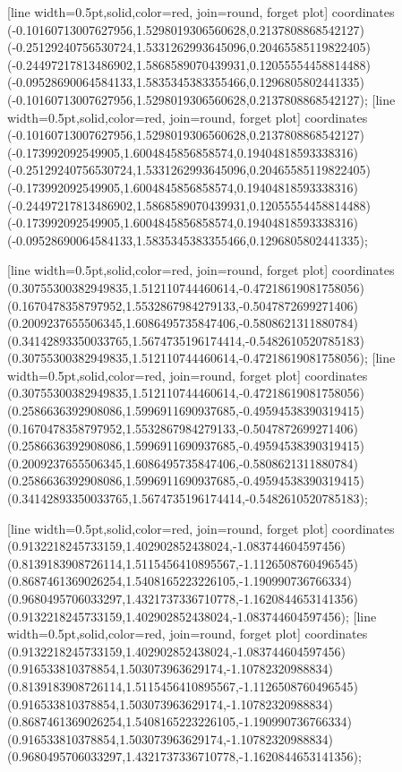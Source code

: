 [line width=0.5pt,solid,color=red, join=round, forget plot] coordinates {(-0.10160713007627956,1.5298019306560628,0.2137808868542127) (-0.25129240756530724,1.5331262993645096,0.20465585119822405) (-0.24497217813486902,1.5868589070439931,0.12055554458814488) (-0.09528690064584133,1.5835345383355466,0.1296805802441335) (-0.10160713007627956,1.5298019306560628,0.2137808868542127)};
[line width=0.5pt,solid,color=red, join=round, forget plot] coordinates {(-0.10160713007627956,1.5298019306560628,0.2137808868542127) (-0.173992092549905,1.6004845856858574,0.19404818593338316) (-0.25129240756530724,1.5331262993645096,0.20465585119822405) (-0.173992092549905,1.6004845856858574,0.19404818593338316) (-0.24497217813486902,1.5868589070439931,0.12055554458814488) (-0.173992092549905,1.6004845856858574,0.19404818593338316) (-0.09528690064584133,1.5835345383355466,0.1296805802441335)};

[line width=0.5pt,solid,color=red, join=round, forget plot] coordinates {(0.30755300382949835,1.512110744460614,-0.47218619081758056) (0.1670478358797952,1.5532867984279133,-0.5047872699271406) (0.2009237655506345,1.6086495735847406,-0.5808621311880784) (0.34142893350033765,1.5674735196174414,-0.5482610520785183) (0.30755300382949835,1.512110744460614,-0.47218619081758056)};
[line width=0.5pt,solid,color=red, join=round, forget plot] coordinates {(0.30755300382949835,1.512110744460614,-0.47218619081758056) (0.2586636392908086,1.5996911690937685,-0.49594538390319415) (0.1670478358797952,1.5532867984279133,-0.5047872699271406) (0.2586636392908086,1.5996911690937685,-0.49594538390319415) (0.2009237655506345,1.6086495735847406,-0.5808621311880784) (0.2586636392908086,1.5996911690937685,-0.49594538390319415) (0.34142893350033765,1.5674735196174414,-0.5482610520785183)};

[line width=0.5pt,solid,color=red, join=round, forget plot] coordinates {(0.9132218245733159,1.402902852438024,-1.083744604597456) (0.8139183908726114,1.5115456410895567,-1.1126508760496545) (0.8687461369026254,1.5408165223226105,-1.190990736766334) (0.9680495706033297,1.4321737336710778,-1.1620844653141356) (0.9132218245733159,1.402902852438024,-1.083744604597456)};
[line width=0.5pt,solid,color=red, join=round, forget plot] coordinates {(0.9132218245733159,1.402902852438024,-1.083744604597456) (0.916533810378854,1.503073963629174,-1.10782320988834) (0.8139183908726114,1.5115456410895567,-1.1126508760496545) (0.916533810378854,1.503073963629174,-1.10782320988834) (0.8687461369026254,1.5408165223226105,-1.190990736766334) (0.916533810378854,1.503073963629174,-1.10782320988834) (0.9680495706033297,1.4321737336710778,-1.1620844653141356)};


